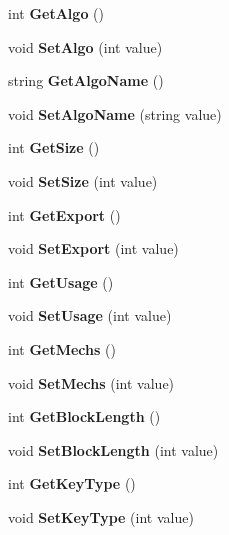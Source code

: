 \begin{DoxyCompactItemize}
int {\bfseries Get\+Algo} ()
\item 
\mbox{\label{class_cxi_cega_1_1_key_properties_aafdf25d00598744a237c28cb133483eb}} 
void {\bfseries Set\+Algo} (int value)
\item 
\mbox{\label{class_cxi_cega_1_1_key_properties_a4fcbd87cc3ef25fa980749ceae6ec357}} 
string {\bfseries Get\+Algo\+Name} ()
\item 
\mbox{\label{class_cxi_cega_1_1_key_properties_aedd71e3ad84eff656a4666b8f12c92bf}} 
void {\bfseries Set\+Algo\+Name} (string value)
\item 
\mbox{\label{class_cxi_cega_1_1_key_properties_ad6086d4f8d2e367cf6d3cda1a79aca90}} 
int {\bfseries Get\+Size} ()
\item 
\mbox{\label{class_cxi_cega_1_1_key_properties_ab7fc17b9aad97cab121083800f4efd09}} 
void {\bfseries Set\+Size} (int value)
\item 
\mbox{\label{class_cxi_cega_1_1_key_properties_ac7df184c2c8885782877b08faed3046d}} 
int {\bfseries Get\+Export} ()
\item 
\mbox{\label{class_cxi_cega_1_1_key_properties_a0ed6cccca5153c8407081c39dd764da1}} 
void {\bfseries Set\+Export} (int value)
\item 
\mbox{\label{class_cxi_cega_1_1_key_properties_a2bbd80348ceff8e4c7f3b1faaa9f1379}} 
int {\bfseries Get\+Usage} ()
\item 
\mbox{\label{class_cxi_cega_1_1_key_properties_a4f66fadd284938a646b482b4d3bec8fc}} 
void {\bfseries Set\+Usage} (int value)
\item 
\mbox{\label{class_cxi_cega_1_1_key_properties_a22add0660bf98226edd44b4fb9b54c78}} 
int {\bfseries Get\+Mechs} ()
\item 
\mbox{\label{class_cxi_cega_1_1_key_properties_ac8ec557abbc70dd4ff77022b43a51914}} 
void {\bfseries Set\+Mechs} (int value)
\item 
\mbox{\label{class_cxi_cega_1_1_key_properties_a5885c1622ef93978b1c53988beb51c74}} 
int {\bfseries Get\+Block\+Length} ()
\item 
\mbox{\label{class_cxi_cega_1_1_key_properties_a2fc345c2b238571e885726f61766249e}} 
void {\bfseries Set\+Block\+Length} (int value)
\item 
\mbox{\label{class_cxi_cega_1_1_key_properties_a5d1f3aa0494905c9c4efb391af331291}} 
int {\bfseries Get\+Key\+Type} ()
\item 
\mbox{\label{class_cxi_cega_1_1_key_properties_a4d327e038a807a6ffb627037a5fa79ab}} 
void {\bfseries Set\+Key\+Type} (int value)
\item 

\end{DoxyCompactItemize}
